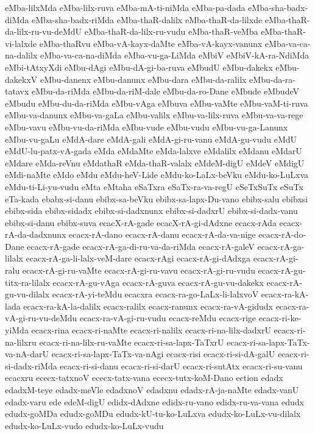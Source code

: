 {eMba-lilxMda
eMba-lilx-ruva
eMba-mA-ti-niMda
eMba-pa-dada
eMba-sha-badx-diMda
eMba-sha-badx-riMda
eMba-thaR-dalilx
eMba-thaR-da-lilxde
eMba-thaR-da-lilx-ru-vu-deMdU
eMba-thaR-da-lilx-ru-vudu
eMba-thaR-veMba
eMba-thaR-vi-lalxde
eMba-thaRvu
eMba-vA-kayx-daMte
eMba-vA-kayx-vanunx
eMba-va-ca-na-dalilx
eMba-va-ca-na-diMda
eMba-vu-ga-LiMda
eMbiV
eMbiV-kA-ra-NdiMda
eMbi-tAtxyXdi
eMbu-dAgi
eMbu-dA-gi-ba-ruva
eMbudU
eMbu-dakekx
eMbu-dakekxV
eMbu-danenx
eMbu-danunx
eMbu-dara
eMbu-da-ralilx
eMbu-da-ra-tatavx
eMbu-da-riMda
eMbu-da-riM-dale
eMbu-da-ro-Dane
eMbude
eMbudeV
eMbudu
eMbu-du-da-riMda
eMbu-vAga
eMbuva
eMbu-vaMte
eMbu-vaM-ti-ruva
eMbu-va-danunx
eMbu-va-gaLa
eMbu-valilx
eMbu-va-lilx-ruva
eMbu-va-va-rege
eMbu-vavu
eMbu-vu-da-riMda
eMbu-vude
eMbu-vudu
eMbu-vu-ga-Lanunx
eMbu-vu-gaLu
eMdA-dare
eMdA-gali
eMdA-gi-ru-vanu
eMdA-gu-vudu
eMdU
eMdU-lu-patx-vA-gada
eMda
eMdaMte
eMda-lalxve
eMdalilx
eMdanu
eMdarU
eMdare
eMda-reVnu
eMdathaR
eMda-thaR-valalx
eMdeM-digU
eMdeV
eMdigU
eMdi-naMte
eMdo
eMdu
eMdu-heV-Lide
eMdu-ko-LaLx-beVku
eMdu-ko-LuLxva
eMdu-ti-Li-yu-vudu
eMta
eMtaha
eSaTxra
eSaTx-ra-va-regU
eSeTxSuTx
eSuTx
eTa-kada
ebabx-si-danu
ebibx-sa-beVku
ebibx-sa-lapx-Du-vano
ebibx-salu
ebibxsi
ebibx-sida
ebibx-sidadx
ebibx-si-dadxnunx
ebibx-si-dadxrU
ebibx-si-dadx-vanu
ebibx-si-danu
ebibx-suva
ecacX-rA-gade
ecacX-rA-gi-dAdxne
ecacx-rAda
ecacx-rA-da-dadxnunx
ecacx-rA-dano
ecacx-rA-danu
ecacx-rA-da-va-nige
ecacx-rA-do-Dane
ecacx-rA-gade
ecacx-rA-ga-di-ru-va-da-riMda
ecacx-rA-galeV
ecacx-rA-ga-lilalx
ecacx-rA-ga-li-lalx-veM-dare
ecacx-rAgi
ecacx-rA-gi-dAdxga
ecacx-rA-gi-ralu
ecacx-rA-gi-ru-vaMte
ecacx-rA-gi-ru-vavu
ecacx-rA-gi-ru-vudu
ecacx-rA-gu-titx-ra-lilalx
ecacx-rA-gu-vAga
ecacx-rA-guva
ecacx-rA-gu-vu-dakekx
ecacx-rA-gu-vu-dilalx
ecacx-rA-yi-teMdu
ecacxra
ecacx-ra-go-LaLx-li-lalxvoV
ecacx-ra-kA-lada
ecacx-ra-kA-la-dalilx
ecacx-ralilx
ecacx-ranunx
ecacx-ra-vA-gidudx
ecacx-ra-vA-gi-ru-vu-deMdu
ecacx-ra-vA-gi-ru-vudu
ecacx-reMdu
ecacx-rige
ecacx-ri-ke-yiMda
ecacx-rina
ecacx-ri-naMte
ecacx-ri-nalilx
ecacx-ri-na-lilx-dadxrU
ecacx-ri-na-lilxru
ecacx-ri-na-lilx-ru-vaMte
ecacx-ri-sa-lapx-TaTxrU
ecacx-ri-sa-lapx-TaTx-va-nA-darU
ecacx-ri-sa-lapx-TaTx-va-nAgi
ecacx-risi
ecacx-ri-si-dA-galU
ecacx-ri-si-dadx-riMda
ecacx-ri-si-danu
ecacx-ri-si-darU
ecacx-ri-sutAtx
ecacx-ri-su-vanu
ecacxru
ececx-tatxnoV
ececx-tatx-vana
ececx-tutx-koM-Dano
ection
edadx
edadxM-teye
edadx-meVle
edadxnoV
edadxnu
edadx-rA-ja-naMte
edadx-vanU
edadx-varu
ede
edeM-digU
edidx-dAdxne
edidx-ru-vano
edidx-ru-va-vana
edudx
edudx-goMDa
edudx-goMDu
edudx-kU-tu-ko-LuLxva
edudx-ko-LuLx-vu-dilalx
edudx-ko-LuLx-vudo
edudx-ko-LuLx-vudu
}
